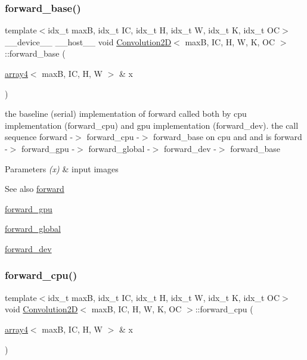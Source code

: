 \subsubsection{\texorpdfstring{forward\+\_\+base()}{forward\_base()}}
{\footnotesize\ttfamily template$<$idx\+\_\+t maxB, idx\+\_\+t IC, idx\+\_\+t H, idx\+\_\+t W, idx\+\_\+t K, idx\+\_\+t OC$>$ \\
\+\_\+\+\_\+device\+\_\+\+\_\+ \+\_\+\+\_\+host\+\_\+\+\_\+ void \hyperlink{structConvolution2D}{Convolution2D}$<$ maxB, IC, H, W, K, OC $>$\+::forward\+\_\+base (\begin{DoxyParamCaption}\item[{\hyperlink{structarray4}{array4}$<$ maxB, IC, H, W $>$ \&}]{x }\end{DoxyParamCaption})\hspace{0.3cm}{\ttfamily [inline]}}



the baseline (serial) implementation of forward called both by cpu implementation (forward\+\_\+cpu) and gpu implementation (forward\+\_\+dev). the call sequence forward -\/$>$ forward\+\_\+cpu -\/$>$ forward\+\_\+base on cpu and and is forward -\/$>$ forward\+\_\+gpu -\/$>$ forward\+\_\+global -\/$>$ forward\+\_\+dev -\/$>$ forward\+\_\+base 


\begin{DoxyParams}{Parameters}
{\em (x)} & input images \\
\hline
\end{DoxyParams}
\begin{DoxySeeAlso}{See also}
\hyperlink{structConvolution2D_ae6dcfaea38b779de24bbda730c57083e}{forward} 

\hyperlink{structConvolution2D_ac8bbdceed275bddaaf937e1b7ce2e5ac}{forward\+\_\+gpu} 

\hyperlink{softmaxcrossentropy_8h_a578aeeb166bd06e800d9b396eab48b35}{forward\+\_\+global} 

\hyperlink{structConvolution2D_a1e5d3b49b05f8444178be5f73f59bedd}{forward\+\_\+dev} 
\end{DoxySeeAlso}
\mbox{\label{structConvolution2D_ac1dcf1aebcf205c34bbf604d3b68562b}} 
\subsubsection{\texorpdfstring{forward\+\_\+cpu()}{forward\_cpu()}}
{\footnotesize\ttfamily template$<$idx\+\_\+t maxB, idx\+\_\+t IC, idx\+\_\+t H, idx\+\_\+t W, idx\+\_\+t K, idx\+\_\+t OC$>$ \\
void \hyperlink{structConvolution2D}{Convolution2D}$<$ maxB, IC, H, W, K, OC $>$\+::forward\+\_\+cpu (\begin{DoxyParamCaption}\item[{\hyperlink{structarray4}{array4}$<$ maxB, IC, H, W $>$ \&}]{x }\end{DoxyParamCaption})\hspace{0.3cm}{\ttfamily [inline]}}



